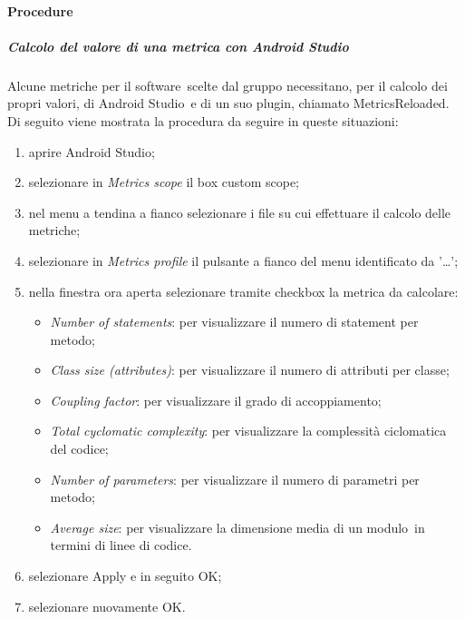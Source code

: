 \documentclass[../NormeProgetto.text]{subfiles}
\begin{document}
		\paragraph{Procedure}
			 \subparagraph{Calcolo del valore di una metrica con Android Studio}
			 	Alcune metriche per il software\g\ scelte dal gruppo necessitano, per il calcolo dei propri valori, di Android Studio\g\ e di un suo plugin, chiamato MetricsReloaded\g.\\
				Di seguito viene mostrata la procedura da seguire in queste situazioni:
				\begin{enumerate}
					\item aprire Android Studio\g;
					\item selezionare in \textit{Metrics scope} il box custom scope;
					\item nel menu a tendina a fianco selezionare i file su cui effettuare il calcolo delle metriche;
					\item selezionare in \textit{Metrics profile} il pulsante a fianco del menu identificato da '\dots';
					\item nella finestra ora aperta selezionare tramite checkbox la metrica da calcolare:
					\begin{itemize}
						\item \textit{Number of statements}: per visualizzare il numero di statement per metodo;
						\item \textit{Class size (attributes)}: per visualizzare il numero di attributi per classe;
						\item \textit{Coupling factor}: per visualizzare il grado di accoppiamento;
						\item \textit{Total cyclomatic complexity}: per visualizzare la complessità ciclomatica del codice;
						\item \textit{Number of parameters}: per visualizzare il numero di parametri per metodo;
						\item \textit{Average size}: per visualizzare la dimensione media di un modulo\g\ in termini di linee di codice.
					\end{itemize}
					\item selezionare Apply e in seguito OK;
					\item selezionare nuovamente OK.
				\end{enumerate}
				
\end{document}
